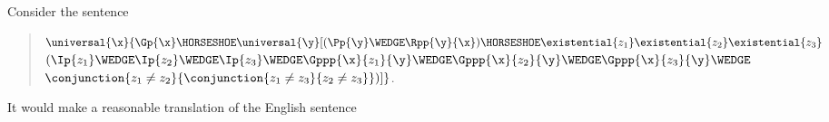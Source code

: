 \begin{majorILnc}{}
Consider the sentence 
\begin{quote}
$\universal{\x}\{\Gp{\x}\HORSESHOE\universal{\y}[(\Pp{\y}\WEDGE\Rpp{\y}{\x})\HORSESHOE\existential{\variable{z}_1}\existential{\variable{z}_2}\existential{\variable{z}_3}$\\
\hspace*{.5in}$(\Ip{\variable{z}_1}\WEDGE\Ip{\variable{z}_2}\WEDGE\Ip{\variable{z}_3}\WEDGE\Gppp{\x}{\variable{z}_1}{\y}\WEDGE\Gppp{\x}{\variable{z}_2}{\y}\WEDGE\Gppp{\x}{\variable{z}_3}{\y}\WEDGE$\\
\hspace*{1in}$\conjunction{\variable{z}_1\neq\variable{z}_2}{\conjunction{\variable{z}_1\neq\variable{z}_3}{\variable{z}_2\neq\variable{z}_3}})]\}$.
\end{quote}
It would make a reasonable translation of the English sentence 
\end{majorILnc}
